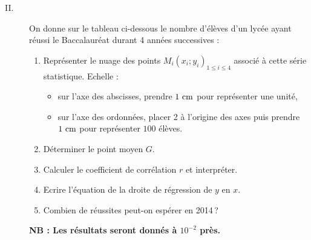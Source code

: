 \begin{description}
            \item[II.] On donne sur le tableau ci-dessous le nombre d'\'el\`eves d'un lyc\'ee ayant r\'eussi le 
                  Baccalaur\'eat durant 4 ann\'ees successives : 
                  \par\smallskip\noindent
                  \par\smallskip
                  \begin{enumerate}
                        \item Repr\'esenter le nuage des points $M_i (x_i ; y_i)_{1 \leq i \leq 4}$ associ\'e \`a cette
                              s\'erie statistique. \newline
                              Echelle : 
                                    \begin{itemize}
                                          \item sur l'axe des abscisses, prendre $1~\mathrm{cm}$ pour repr\'esenter une unit\'e,
                                          \item sur l'axe des ordonn\'ees, placer 2 \`a l'origine des axes puis prendre
                                                $1~\mathrm{cm}$ pour repr\'esenter $100$ \'el\`eves.
                                    \end{itemize}
                        \item D\'eterminer le point moyen $G$.
                        \item Calculer le coefficient de corr\'elation $r$ et interpr\'eter.
                        \item Ecrire l'\'equation de la droite de r\'egression de $y$ en $x$.
                        \item Combien de r\'eussites peut-on esp\'erer en 2014\,?
                  \end{enumerate}
                  \textbf{NB : Les r\'esultats seront donn\'es \`a $10^{-2}$ pr\`es.}
      \end{description}
